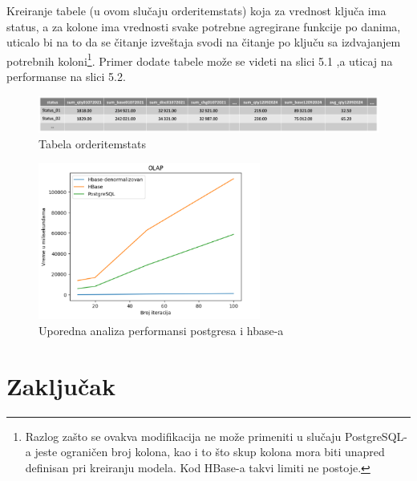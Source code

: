 \documentclass[12pt,oneside]{memoir}
\begin{document}
Kreiranje tabele (u ovom slučaju orderitemstats) koja za vrednost ključa ima status, a za kolone ima vrednosti svake potrebne agregirane funkcije po danima, uticalo bi na to da se čitanje izveštaja svodi na čitanje po ključu sa izdvajanjem potrebnih koloni\footnote{ Razlog zašto se ovakva modifikacija ne može primeniti u slučaju PostgreSQL-a jeste ograničen broj kolona, kao i to što skup kolona mora biti unapred definisan pri kreiranju modela. Kod HBase-a takvi limiti ne postoje.}.
Primer dodate tabele može se videti na slici 5.1 ,a uticaj na performanse na slici 5.2.

\begin{figure}[!ht]
  \centering
  \includegraphics[width=1\textwidth]{denormalized-model.png}
  \caption{Tabela orderitemstats}
  \label{fig:grafikon}
\end{figure}

\begin{figure}[!ht]
  \centering
  \includegraphics[width=0.65\textwidth]{olap-vizualization.png}
  \caption{Uporedna analiza performansi postgresa i hbase-a}
  \label{fig:grafikon}
\end{figure}


























\chapter{Zaključak}
\end{document}
